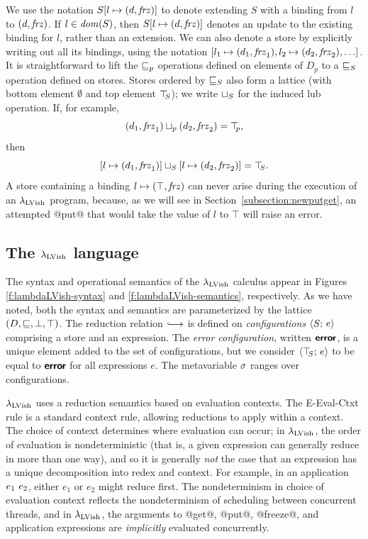 \documentclass{article}
\begin{document}
We use the notation $S[l \mapsto (d, \mathit{frz})]$ to denote extending $S$
with a binding from $l$ to $(d, \mathit{frz})$.  If $l \in \mathit{dom}(S)$,
then $S[l \mapsto (d, \mathit{frz})]$ denotes an update to the existing
binding for $l$, rather than an extension.  We can also denote a store
by explicitly writing out all its bindings, using the notation
$\store{\storebinding{l_1}{d_1}{\status_1},
  \storebinding{l_2}{d_2}{\status_2}, \dots}$.  It is straightforward
to lift the $\sqsubseteq_p$ operations defined on elements of $D_p$ to a
$ \sqsubseteq_S $ operation defined on stores.  Stores ordered by
$ \sqsubseteq_S $ also form a lattice (with bottom element $\emptyset$
and top element $\top\hspace{-0.85mm}_{S}$); we write $ \sqcup_{S} $ for the induced lub
operation. If, for example,
\[ (d_1, \mathit{frz}_1) \sqcup_p (d_2, \mathit{frz}_2) = \top\hspace{-0.85mm}_{p}, \]
then
\[ \left[ l \mapsto (d_1, \mathit{frz}_1) \right] \sqcup_{S} \left[ l \mapsto (d_2, \mathit{frz}_2) \right] =
\top\hspace{-0.85mm}_{S}. \] A store containing a binding
$l \mapsto (\top, \mathit{frz})$ can never arise during the execution
of an $\lambda_{\textrm{LVish}}$ program, because, as we will see in
Section~\ref{subsection:newputget}, an attempted @put@ that would
take the value of $l$ to $\top$ will raise an error.

\subsection{The $\lambda_{\textrm{LVish}}$ language}

\FigLambdaLVishGrammar

\FigLambdaLVishSemantics

The syntax and operational semantics of the $\lambda_{\textrm{LVish}}$ calculus
appear in Figures \ref{f:lambdaLVish-syntax} and
\ref{f:lambdaLVish-semantics}, respectively.  As we have noted, both
the syntax and semantics are parameterized by the lattice $(D,
\sqsubseteq, \bot, \top)$.  The reduction relation $\parstepsto$ is
defined on \emph{configurations} $\langle S;\, e \rangle$ comprising a store
and an expression.  The \emph{error configuration}, written $\textbf{\textsf{error}}$,
is a unique element added to the set of configurations, but we
consider $\langle \top\hspace{-0.85mm}_{S};\, e \rangle$ to be equal to $\textbf{\textsf{error}}$ for all
expressions $e$.  The metavariable $\sigma$ ranges over configurations.

$\lambda_{\textrm{LVish}}$ uses a reduction semantics based on evaluation
contexts.  The {\sc E-Eval-Ctxt} rule is a standard context rule,
allowing reductions to apply within a context.  The choice of context
determines where evaluation can occur; in $\lambda_{\textrm{LVish}}$, the order of
evaluation is nondeterministic (that is, a given expression can
generally reduce in more than one way), and so it is generally
\emph{not} the case that an expression has a unique decomposition into
redex and context.  For example, in an application $e_1~e_2$,
either $e_1$ or $e_2$ might reduce first.  The nondeterminism in
choice of evaluation context reflects the nondeterminism of scheduling
between concurrent threads, and in $\lambda_{\textrm{LVish}}$, the arguments to
@get@, @put@, @freeze@, and application expressions are
\emph{implicitly} evaluated concurrently.
\end{document}
